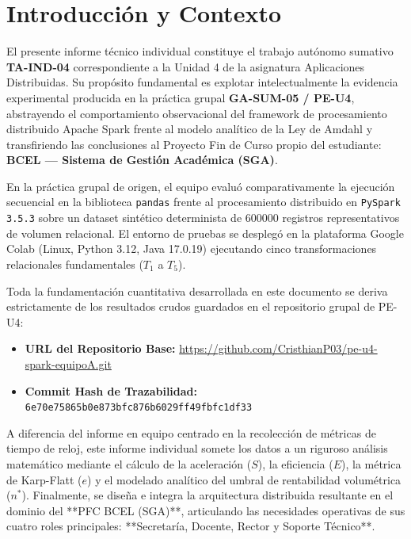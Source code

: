 \documentclass[11pt,a4paper]{article}
\begin{document}
\newpage
{}
\setcounter{page}{2}

\section{Introducción y Contexto}

El presente informe técnico individual constituye el trabajo autónomo sumativo \textbf{TA-IND-04} correspondiente a la Unidad 4 de la asignatura Aplicaciones Distribuidas. Su propósito fundamental es explotar intelectualmente la evidencia experimental producida en la práctica grupal \textbf{GA-SUM-05 / PE-U4}, abstrayendo el comportamiento observacional del framework de procesamiento distribuido Apache Spark frente al modelo analítico de la Ley de Amdahl \cite{amdahl1967} y transfiriendo las conclusiones al Proyecto Fin de Curso propio del estudiante: \textbf{BCEL — Sistema de Gestión Académica (SGA)}.

En la práctica grupal de origen, el equipo evaluó comparativamente la ejecución secuencial en la biblioteca \texttt{pandas} frente al procesamiento distribuido en \texttt{PySpark 3.5.3} sobre un dataset sintético determinista de \num{600000} registros representativos de volumen relacional. El entorno de pruebas se desplegó en la plataforma Google Colab (Linux, Python 3.12, Java 17.0.19) ejecutando cinco transformaciones relacionales fundamentales ($T_1$ a $T_5$).

Toda la fundamentación cuantitativa desarrollada en este documento se deriva estrictamente de los resultados crudos guardados en el repositorio grupal de PE-U4:
\begin{itemize}
    \item \textbf{URL del Repositorio Base:} \url{https://github.com/CristhianP03/pe-u4-spark-equipoA.git}
    \item \textbf{Commit Hash de Trazabilidad:} \texttt{6e70e75865b0e873bfc876b6029ff49fbfc1df33}
\end{itemize}

A diferencia del informe en equipo centrado en la recolección de métricas de tiempo de reloj, este informe individual somete los datos a un riguroso análisis matemático mediante el cálculo de la aceleración ($S$), la eficiencia ($E$), la métrica de Karp-Flatt ($e$) \cite{karpflatt1990} y el modelado analítico del umbral de rentabilidad volumétrica ($n^*$). Finalmente, se diseña e integra la arquitectura distribuida resultante en el dominio del **PFC BCEL (SGA)**, articulando las necesidades operativas de sus cuatro roles principales: **Secretaría, Docente, Rector y Soporte Técnico**.
\end{document}
